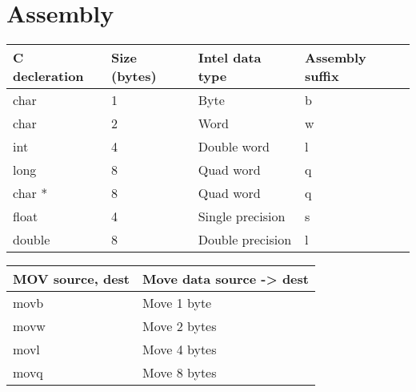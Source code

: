 \section*{Assembly}

\begin{tabular}{| l | l | l | l |}
    \hline
    C decleration & Size (bytes) & Intel data type & Assembly suffix \\
    \hline
    char & 1 & Byte & b \\
    char & 2 & Word & w \\
    int & 4 & Double word & l \\
    long & 8 & Quad word & q \\
    char * & 8 & Quad word & q \\
    float & 4 & Single precision & s \\
    double & 8 & Double precision & l \\
    \hline
\end{tabular}
\newline
\newline

\begin{tabular}{| l | l |}
    \hline
    MOV source, dest & Move data source -> dest \\
    \hline
    movb & Move 1 byte \\
    movw & Move 2 bytes \\
    movl & Move 4 bytes \\
    movq & Move 8 bytes \\
    \hline
\end{tabular}
